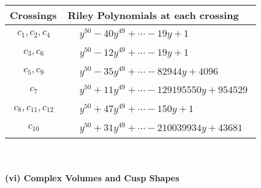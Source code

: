 \documentclass[1p]{elsarticle_modified}
\theoremstyle{definition}
\begin{document}
\begin{tabular}{m{50pt}|m{274pt}}
Crossings & \hspace{64pt}Riley Polynomials at each crossing \\
\hline $$\begin{aligned}c_{1},c_{2},c_{4}\end{aligned}$$&$\begin{aligned}
&y^{50}-40 y^{49}+\cdots-19 y+1
\end{aligned}$\\
\hline $$\begin{aligned}c_{3},c_{6}\end{aligned}$$&$\begin{aligned}
&y^{50}-12 y^{49}+\cdots-19 y+1
\end{aligned}$\\
\hline $$\begin{aligned}c_{5},c_{9}\end{aligned}$$&$\begin{aligned}
&y^{50}-35 y^{49}+\cdots-82944 y+4096
\end{aligned}$\\
\hline $$\begin{aligned}c_{7}\end{aligned}$$&$\begin{aligned}
&y^{50}+11 y^{49}+\cdots-129195550 y+954529
\end{aligned}$\\
\hline $$\begin{aligned}c_{8},c_{11},c_{12}\end{aligned}$$&$\begin{aligned}
&y^{50}+47 y^{49}+\cdots-150 y+1
\end{aligned}$\\
\hline $$\begin{aligned}c_{10}\end{aligned}$$&$\begin{aligned}
&y^{50}+31 y^{49}+\cdots-210039934 y+43681
\end{aligned}$\\
\hline
\end{tabular}\\~\\
\newpage\flushleft \textbf{(vi) Complex Volumes and Cusp Shapes}
\end{document}
